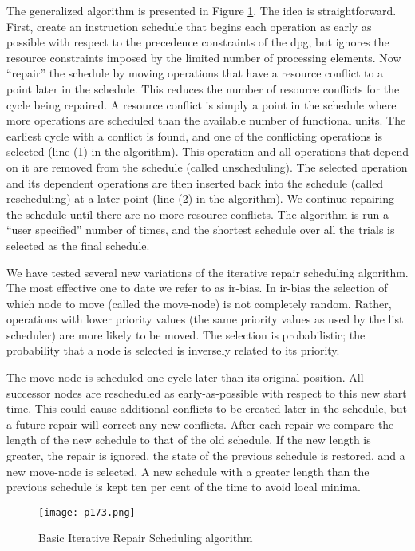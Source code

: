 The generalized algorithm is presented in Figure \ref{fig:p173}. The idea is straightforward. First, create an instruction
schedule that begins each operation as early as possible with respect to the precedence constraints of the dpg,
but ignores the resource constraints imposed by the limited number of processing elements. Now “repair” the
schedule by moving operations that have a resource conflict to a point later in the schedule. This reduces the
number of resource conflicts for the cycle being repaired. A resource conflict is simply a point in the schedule
where more operations are scheduled than the available number of functional units. The earliest cycle with a
conflict is found, and one of the conflicting operations is selected (line (1) in the algorithm). This operation
and all operations that depend on it are removed from the schedule (called unscheduling). The selected
operation and its dependent operations are then inserted back into the schedule (called rescheduling) at a
later point (line (2) in the algorithm). We continue repairing the schedule until there are no more resource
conflicts. The algorithm is run a “user specified” number of times, and the shortest schedule over all the
trials is selected as the final schedule.

We have tested several new variations of the iterative repair scheduling algorithm. The most effective
one to date we refer to as ir-bias. In ir-bias the selection of which node to move (called the move-node) is
not completely random. Rather, operations with lower priority values (the same priority values as used by
the list scheduler) are more likely to be moved. The selection is probabilistic; the probability that a node is
selected is inversely related to its priority.

The move-node is scheduled one cycle later than its original position. All successor nodes are rescheduled
as early-as-possible with respect to this new start time. This could cause additional conflicts to be created
later in the schedule, but a future repair will correct any new conflicts. After each repair we compare the
length of the new schedule to that of the old schedule. If the new length is greater, the repair is ignored,
the state of the previous schedule is restored, and a new move-node is selected. A new schedule with a
greater length than the previous schedule is kept ten per cent of the time to avoid local minima.
\begin{figure}[H]
	\centering
	\texttt{[image: p173.png]}
	\caption{Basic Iterative Repair Scheduling algorithm}
	\label{fig:p173}
\end{figure}
